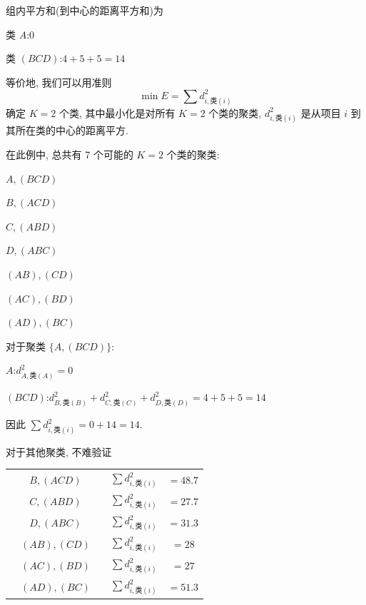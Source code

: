 
组内平方和(到中心的距离平方和)为

\hspace*{6em}类 $A$:\hfill 0

\hspace*{6em}类 $(BCD)$:\hfill $4+5+5=14$

等价地, 我们可以用准则
\[
\min E=\sum d^{2}_{i,\text{类}(i)}
\]
确定 $K=2$ 个类, 其中最小化是对所有 $K=2$ 个类的聚类, $d^{2}_{i,\text{类}(i)}$ 是从项目 $i$ 到其所在类的中心的距离平方.

在此例中, 总共有 7 个可能的 $K=2$ 个类的聚类:

\hspace*{4em}$A,(BCD)$

\hspace*{4em}$B,(ACD)$

\hspace*{4em}$C,(ABD)$

\hspace*{4em}$D,(ABC)$

\hspace*{4em}$(AB),(CD)$

\hspace*{4em}$(AC),(BD)$

\hspace*{4em}$(AD),(BC)$

\noindent 对于聚类 $\{A,(BCD)\}$:

\hspace*{6em}$A$:\hfill $d^{2}_{A,\text{类}(A)}=0$

\hspace*{6em}$(BCD)$:\hfill $d^{2}_{B,\text{类}(B)}+d^{2}_{C,\text{类}(C)}+d^{2}_{D,\text{类}(D)}=4+5+5=14$

因此 $\sum d^{2}_{i,\text{类}(i)}=0+14=14$.

\noindent 对于其他聚类, 不难验证

\begin{mvtable}
\begin{tabular}{lcccc}
& $B,(ACD)$ & & $\sum d^{2}_{i,\text{类}(i)}$ & $=48.7$\\[4pt]
& $C,(ABD)$ & & $\sum d^{2}_{i,\text{类}(i)}$ & $=27.7$\\[4pt]
& $D,(ABC)$ & & $\sum d^{2}_{i,\text{类}(i)}$ & $=31.3$\\[4pt]
& $(AB),(CD)$ & & $\sum d^{2}_{i,\text{类}(i)}$ & $=28$\\[4pt]
& $(AC),(BD)$ & & $\sum d^{2}_{i,\text{类}(i)}$ & $=27$\\[4pt]
& $(AD),(BC)$ & & $\sum d^{2}_{i,\text{类}(i)}$ & $=51.3$
\end{tabular}
\end{mvtable}

